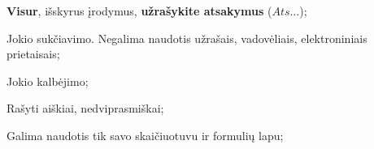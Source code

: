 \documentclass[a4paper]{article}
\begin{document}
\begin{small}
      \begin{enumerate*}[label={(\arabic*)}]
            \item \textbf{Visur}, išskyrus įrodymus, \textbf{užrašykite
                  atsakymus} ($Ats\ldots$);
            \item Jokio sukčiavimo. Negalima naudotis užrašais, vadovėliais,
            elektroniniais prietaisais;
            \item Jokio kalbėjimo;
            \item Rašyti aiškiai, nedviprasmiškai;
            \item Galima naudotis tik savo skaičiuotuvu ir formulių lapu;
      \end{enumerate*}
\end{small}
\end{document}
